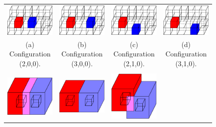 \begin{figure}
\centering
\begin{tabular}{cccc}
\includegraphics[width=1.2in]{images/config3D_2_0_0.eps} \qquad &
\qquad
\includegraphics[width=1.2in]{images/config3D_3_0_0.eps}
\qquad &
\qquad
\includegraphics[width=1.2in]{images/config3D_2_1_0.eps}
\qquad &
\qquad
\includegraphics[width=1.2in]{images/config3D_3_1_0.eps} \\
(a) Configuration (2,0,0). & (b) Configuration (3,0,0). 
  & (c) Configuration (2,1,0). & (d) Configuration (3,1,0).\\
\\
\includegraphics[width=1.2in]{images/config3D_2_0_0_3x3x3.eps} \qquad &
\qquad
\includegraphics[width=1.2in]{images/config3D_3_0_0_3x3x3.eps}
\qquad &
\qquad
\includegraphics[width=1.2in]{images/config3D_2_1_0_3x3x3.eps}

\end{tabular}
\end{figure}
